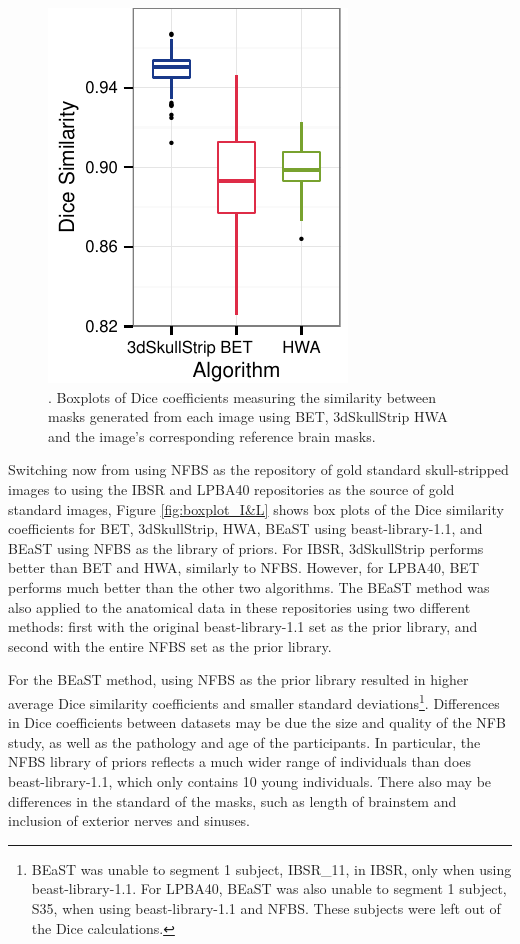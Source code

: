 \begin{figure}[h!]
    \includegraphics[]{boxplot_nfbs.pdf}
    \caption{. Boxplots of Dice coefficients measuring the similarity between masks generated from each image using BET, 3dSkullStrip HWA and the image's corresponding reference brain masks. }
    \label{fig:boxplot_NFBS}
\end{figure}

Switching now from using NFBS as the repository of gold standard skull-stripped images to using the IBSR and LPBA40 repositories as the source of gold standard images, Figure \ref{fig:boxplot_I&L} shows box plots of the Dice similarity coefficients for BET, 3dSkullStrip, HWA, BEaST using beast-library-1.1, and BEaST using NFBS as the library of priors. For IBSR, 3dSkullStrip performs better than BET and HWA, similarly to NFBS. However, for LPBA40, BET performs much better than the other two algorithms. The BEaST method was also applied to the anatomical data in these repositories using two different methods: first with the original beast-library-1.1 set as the prior library, and second with the entire NFBS set as the prior library.

For the BEaST method, using NFBS as the prior library resulted in higher average Dice similarity coefficients and smaller standard deviations\footnote{BEaST was unable to segment 1 subject, IBSR\_11, in IBSR, only when using beast-library-1.1. For LPBA40, BEaST was also unable to segment 1 subject, S35, when using beast-library-1.1 and NFBS. These subjects were left out of the Dice calculations.}. Differences in Dice coefficients between datasets may be due the size and quality of the NFB study, as well as the pathology and age of the participants. In particular, the NFBS library of priors reflects a much wider range of individuals than does beast-library-1.1, which only contains 10 young individuals. There also may be differences in the standard of the masks, such as length of brainstem and inclusion of exterior nerves and sinuses.


